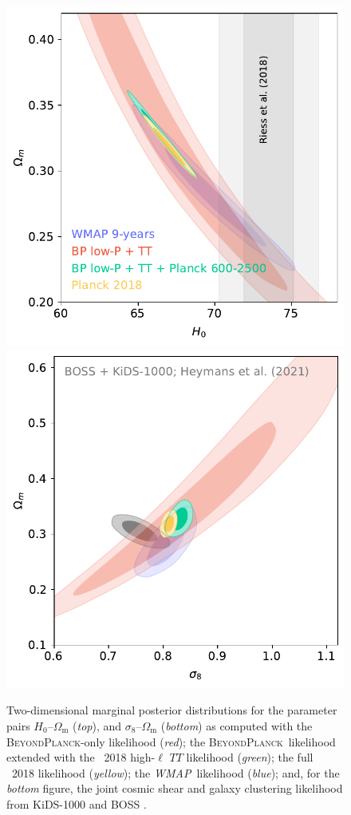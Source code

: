 \documentclass[twocolumn]{aa}
\def\WMAP{\textit{WMAP}}
\newcommand{\BP}{\textsc{BeyondPlanck}}
\providecommand{\DIFaddend}{} %
\DeclareRobustCommand{\DIFaddend}{\DIFOaddend \let\includegraphics\DIFOincludegraphics} %
\begin{document}
\DIFaddend \begin{figure}[ht]
	\center
	\includegraphics[width=\linewidth]{figs/BP10_ext_H0_OmM.pdf} \\
	\includegraphics[width=\linewidth]{figs/BP10_ext_s8_OmM.pdf}
	\caption{Two-dimensional marginal posterior distributions for the parameter pairs 
	$H_0$--$\Omega_{\mathrm m}$ (\emph{top}), and $\sigma_8$--$\Omega_{\mathrm m}$ (\emph{bottom}) 
	as computed with the \BP-only likelihood (\emph{red}); the
        \BP\ likelihood extended with the \Planck\ 2018 high-$\ell$
        $TT$ likelihood (\emph{green}); the full \Planck\ 2018 likelihood 
	(\emph{yellow}); the \WMAP\ likelihood (\emph{blue}); and, for the 
	\emph{bottom} figure, the joint cosmic shear and galaxy clustering
	likelihood from KiDS-1000 and BOSS \citep[][\emph{gray}]{KiDS2021}.}
	\label{fig:s8_omb}
\end{figure}
\end{document}
